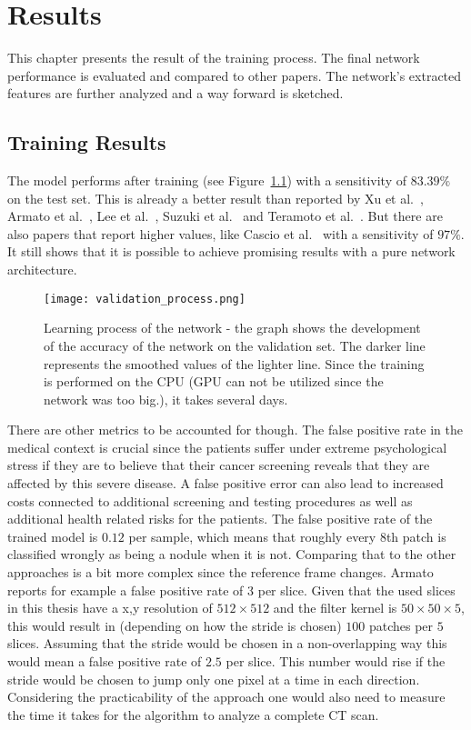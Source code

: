 \documentclass[main.tex]{subfiles}
\begin{document}
\chapter{Results}\label{chap:results}
This chapter presents the result of the training process. The final network performance is evaluated and compared to other papers. The network's extracted features are further analyzed and a way forward is sketched.

\section{Training Results}
The model performs after training (see Figure~\ref{fig:validation}) with a sensitivity of $83.39\%$ on the test set. This is already a better result than reported by Xu et al.~\cite{xu1997development}, Armato et al.~\cite{armato1999computerized}, Lee et al.~\cite{lee2001automated}, Suzuki et al.~\cite{suzuki2003massive} and Teramoto et al.~\cite{teramoto2013fast}. But there are also papers that report higher values, like Cascio et al.~\cite{cascio2012automatic} with a sensitivity of $97\%$. It still shows that it is possible to achieve promising results with a pure network architecture.

\begin{figure}
\begin{center}
\texttt{[image: validation\_process.png]}
\end{center}
\caption{Learning process of the network - the graph shows the development of the accuracy of the network on the validation set. The darker line represents the smoothed values of the lighter line. Since the training is performed on the CPU (GPU can not be utilized since the network was too big.), it takes several days.}
\label{fig:validation}
\end{figure}

There are other metrics to be accounted for though. The false positive rate in the medical context is crucial since the patients suffer under extreme psychological stress if they are to believe that their cancer screening reveals that they are affected by this severe disease. A false positive error can also lead to increased costs connected to additional screening and testing procedures as well as additional health related risks for the patients. The false positive rate of the trained model is $0.12$ per sample, which means that roughly every 8th patch is classified wrongly as being a nodule when it is not. Comparing that to the other approaches is a bit more complex since the reference frame changes. Armato~\cite{armato1999computerized} reports for example a false positive rate of 3 per slice. Given that the used slices in this thesis have a x,y resolution of $512 \times 512$ and the filter kernel is $50 \times 50 \times 5$, this would result in (depending on how the stride is chosen) $100$ patches per $5$ slices. Assuming that the stride would be chosen in a non-overlapping way this would mean a false positive rate of $2.5$ per slice. This number would rise if the stride would be chosen to jump only one pixel at a time in each direction.  
Considering the practicability of the approach one would also need to measure the time it takes for the algorithm to analyze a complete CT scan.
\end{document}
